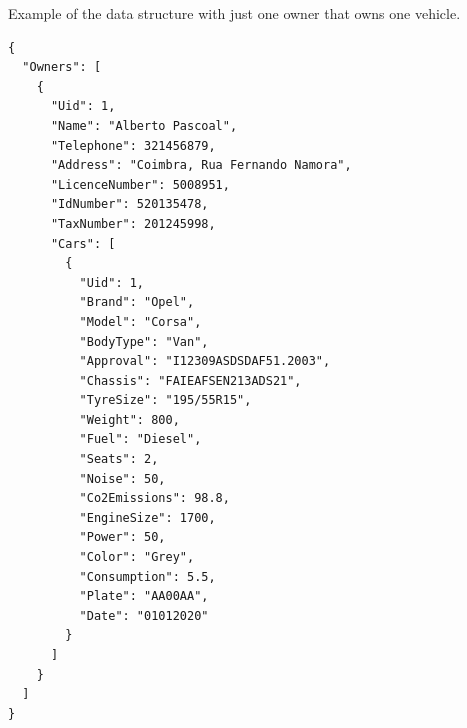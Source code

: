\documentclass{article}
\begin{document}
\qquad Example of the data structure with just one owner that owns one vehicle.

\begin{lstlisting}
{
  "Owners": [
    {
      "Uid": 1,
      "Name": "Alberto Pascoal",
      "Telephone": 321456879,
      "Address": "Coimbra, Rua Fernando Namora",
      "LicenceNumber": 5008951,
      "IdNumber": 520135478,
      "TaxNumber": 201245998,
      "Cars": [
        {
          "Uid": 1,
          "Brand": "Opel",
          "Model": "Corsa",
          "BodyType": "Van",
          "Approval": "I12309ASDSDAF51.2003",
          "Chassis": "FAIEAFSEN213ADS21",
          "TyreSize": "195/55R15",
          "Weight": 800,
          "Fuel": "Diesel",
          "Seats": 2,
          "Noise": 50,
          "Co2Emissions": 98.8,
          "EngineSize": 1700,
          "Power": 50,
          "Color": "Grey",
          "Consumption": 5.5,
          "Plate": "AA00AA",
          "Date": "01012020"
        }
      ]
    }
  ]
}
\end{lstlisting}
\end{document}
